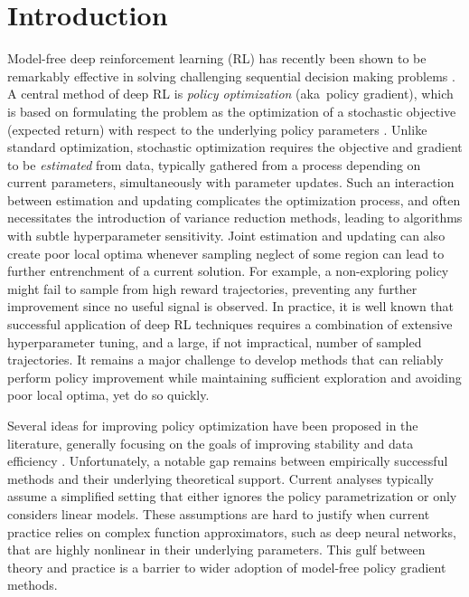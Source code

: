 
\section{Introduction}
\label{sec:intro}


Model-free deep reinforcement learning (RL) has recently
been shown to be remarkably effective in solving
challenging sequential decision making problems
\citep{schulman2015trust,mnih2015human,silver2016mastering}.
A central method of deep RL is \emph{policy optimization}
(aka\ policy gradient),
which is based on formulating the problem
as the optimization of a stochastic objective (expected return)
with respect to the underlying policy parameters %
\citep{williams1991function,williams1992simple,sutton1998reinforcement}.
Unlike standard optimization,
stochastic optimization requires the objective and gradient to be 
\emph{estimated} from data,
typically gathered from a process depending on current parameters, 
simultaneously with parameter updates.
Such an interaction between estimation and updating
complicates the optimization process,
and often necessitates the introduction of variance reduction methods,
leading to algorithms %
with
subtle hyperparameter sensitivity.
Joint estimation and %
updating can also create poor local optima
whenever sampling neglect of some region
can lead to further entrenchment of a current solution.
For example, a non-exploring policy might fail to sample from high
reward trajectories,
preventing any further improvement since no useful signal is observed.
In practice, it is well known that successful application of deep RL techniques
requires a combination of extensive hyperparameter tuning,
and a large, if not impractical, number of sampled trajectories.
It remains a major challenge to develop methods that can reliably
perform policy improvement while maintaining sufficient exploration
and avoiding poor local optima, yet do so quickly.

Several ideas for improving policy optimization have been proposed
in the literature, 
generally focusing on the goals of improving stability and data efficiency
\citep{peters2010relative,van2015learning,fox2015taming,schulman2015trust,montgomery2016guided,nachum2017bridging,nachum2017trust,tangkaratt2017guide,abdolmaleki2018maximum,haarnoja2018soft}. 
Unfortunately, a notable gap remains between empirically successful methods 
and their underlying theoretical support.
Current analyses typically assume a simplified setting that either ignores the 
policy parametrization or only considers linear models.
These assumptions are hard to justify when current practice relies on 
complex function approximators, such as deep neural networks,
that are highly nonlinear in their underlying parameters.
This gulf between theory and practice is
a barrier to wider adoption of model-free policy gradient methods.

